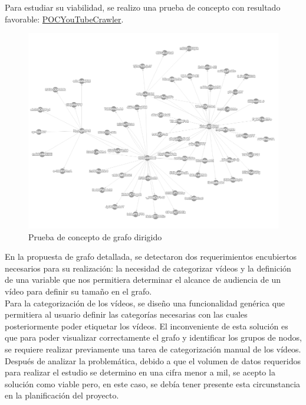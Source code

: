 \documentclass[11pt,a4paper]{article}
\begin{document}
Para estudiar su viabilidad, se realizo una prueba de concepto con resultado favorable: \href{https://github.com/jsanchezmend/TFGAntivacunas/tree/master/POCYouTubeCrawler}{POCYouTubeCrawler}.
\begin{figure}[H]
\centering
\includegraphics[scale=0.30]{grafo/pocGrafo.png}
\caption{Prueba de concepto de grafo dirigido}
\end{figure}

En la propuesta de grafo detallada, se detectaron dos requerimientos encubiertos necesarios para su realización: la necesidad de categorizar vídeos y la definición de una variable que nos permitiera determinar el alcance de audiencia de un vídeo para definir su tamaño en el grafo.
\\

Para la categorización de los vídeos, se diseño una funcionalidad genérica que permitiera al usuario definir las categorías necesarias con las cuales posteriormente poder etiquetar los vídeos. El inconveniente de esta solución es que para poder visualizar correctamente el grafo y identificar los grupos de nodos, se requiere realizar previamente una tarea de categorización manual de los vídeos. Después de analizar la problemática, debido a que el volumen de datos requeridos para realizar el estudio se determino en una cifra menor a mil, se acepto la solución como viable pero, en este caso, se debía tener presente esta circunstancia en la planificación del proyecto.
\\
\end{document}
